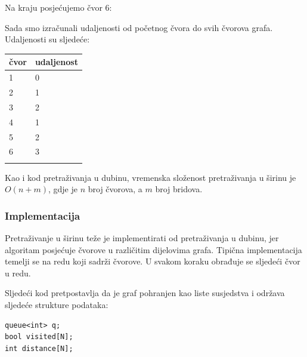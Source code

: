 Na kraju posjećujemo čvor 6:
\begin{center}
\end{center}
Sada smo izračunali udaljenosti
od početnog čvora do svih čvorova grafa.
Udaljenosti su sljedeće:

\begin{tabular}{ll}
\\
čvor & udaljenost \\
\hline
1 & 0 \\
2 & 1 \\
3 & 2 \\
4 & 1 \\
5 & 2 \\
6 & 3 \\
\\
\end{tabular}

Kao i kod pretraživanja u dubinu,
vremenska složenost pretraživanja u širinu
je $O(n+m)$, gdje je $n$ broj čvorova,
a $m$ broj bridova.

\subsubsection*{Implementacija}

Pretraživanje u širinu teže je
implementirati od pretraživanja u dubinu,
jer algoritam posjećuje čvorove
u različitim dijelovima grafa.
Tipična implementacija temelji se na
redu koji sadrži čvorove.
U svakom koraku obrađuje se
sljedeći čvor u redu.

Sljedeći kod pretpostavlja da je graf pohranjen
kao liste susjedstva i održava sljedeće
strukture podataka:
\begin{lstlisting}
queue<int> q;
bool visited[N];
int distance[N];
\end{lstlisting}

